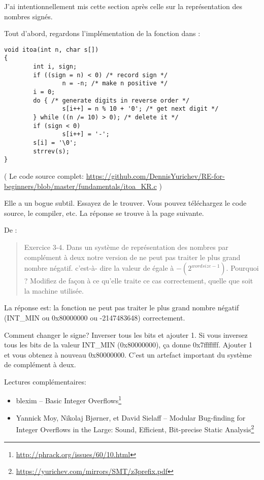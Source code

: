 
J'ai intentionnellement mis cette section après celle sur la représentation des nombres
signés.

Tout d'abord, regardons l'implémentation de la fonction   dans \InSqBrackets{\KRBook}:

\begin{lstlisting}[style=customc]
void itoa(int n, char s[])
{
        int i, sign;
        if ((sign = n) < 0) /* record sign */
                n = -n; /* make n positive */
        i = 0;
        do { /* generate digits in reverse order */
                s[i++] = n % 10 + '0'; /* get next digit */
        } while ((n /= 10) > 0); /* delete it */
        if (sign < 0)
                s[i++] = '-';
        s[i] = '\0';
        strrev(s);
}
\end{lstlisting}

( Le code source complet: \url{https://github.com/DennisYurichev/RE-for-beginners/blob/master/fundamentals/itoa_KR.c} )

Elle a un bogue subtil. Essayez de le trouver. Vous pouvez téléchargez le code source,
le compiler, etc.
La réponse se trouve à la page suivante.

\clearpage

De \InSqBrackets{\KRBook}:

\begin{framed}
\begin{quotation}
Exercice 3-4. Dans un système de représentation des nombres par complément à deux
notre version de  ne peut pas traiter le plus grand nombre négatif. c'est-à-
dire la valeur de  égale à $-(2^{wordsize-1})$. Pourquoi ? Modifiez 
de façon à ce qu'elle traite ce cas correctement, quelle que soit la machine utilisée.
\end{quotation}
\end{framed}

La réponse est: la fonction ne peut pas traiter le plus grand nombre négatif (INT\_MIN
ou 0x80000000 ou -2147483648) correctement.

Comment changer le signe? Inverser tous les bits et ajouter 1.
Si vous inversez tous les bits de la valeur INT\_MIN (0x80000000), ça donne 0x7fffffff.
Ajouter 1 et vous obtenez à nouveau 0x80000000.
C'est un artefact important du système de complément à deux.

Lectures  complémentaires:

\begin{itemize}
\item blexim -- Basic Integer Overflows\footnote{\url{http://phrack.org/issues/60/10.html}}

\item Yannick Moy, Nikolaj Bjørner, et David Sielaff -- Modular Bug-finding for Integer Overflows in the Large: Sound, Efficient, Bit-precise Static Analysis\footnote{\url{https://yurichev.com/mirrors/SMT/z3prefix.pdf}}
\end{itemize}

